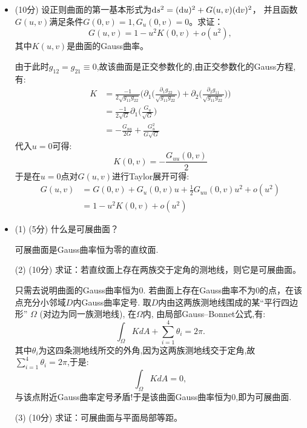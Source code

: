 \begin{itemize}
\begin{proofc}
$$        $$
        可得$\frac{d\gamma}{dt}$为主方向.综上,主方向决定于微分方程(1)(2).
    \end{proofc}
    \item[三] (10分) 设正则曲面的第一基本形式为${\rm d}s^2=({\rm d}u)^2+G(u,v)({\rm d}v)^2$，
    并且函数$G(u,v)$满足条件$G(0,v)=1,G_u(0,v)=0$。求证：
    \[G(u,v)=1-u^2K(0,v)+o(u^2),\]
    其中$K(u,v)$是曲面的Gauss曲率。
    \begin{proofc}
        由于此时$g_{12}=g_{21}\equiv 0$,故该曲面是正交参数化的,由正交参数化的Gauss方程,有:
        \begin{align*}
            K&=\frac{-1}{2\sqrt{g_{11}g_{22}}}\Big(\partial_{1}\Big(\frac{\partial_{1}g_{22}}{\sqrt{g_{11}g_{22}}}\Big)+\partial_{2}\Big(\frac{\partial_{2}g_{11}}{\sqrt{g_{11}g_{22}}}\Big)\Big)\\
            &=\frac{-1}{2\sqrt{G}}\partial_{1}\Big(\frac{G_{u}}{\sqrt{G}}\Big)\\
            &=-\frac{G_{uu}}{2G}+\frac{G_{u}^{2}}{G\sqrt{G}}
        \end{align*}
        代入$u=0$可得:
        $$
            K(0,v)=-\frac{G_{uu}(0,v)}{2}
        $$
        于是在$u=0$点对$G(u,v)$进行Taylor展开可得:
        \begin{align*}
            G(u,v)&=G(0,v)+G_{u}(0,v)u+\frac{1}{2}G_{uu}(0,v)u^{2}+o(u^{2})\\
            &=1-u^{2}K(0,v)+o(u^{2})
        \end{align*}
    \end{proofc}
    \item[四] (1) (5分) 什么是可展曲面？
    \begin{proofc}[解]
        可展曲面是Gauss曲率恒为零的直纹面.
    \end{proofc}
    (2) (10分) 求证：若直纹面上存在两族交于定角的测地线，则它是可展曲面。
    \begin{proofc}
        只需去说明曲面的Gauss曲率恒为$0$. 
        若曲面上存在Gauss曲率不为$0$的点，在该点充分小邻域$D$内Gauss曲率定号. 
        取$D$内由这两族测地线围成的某``平行四边形'' $\Omega$ (对边为同一族测地线), 
        在$\Omega$内, 由局部Gauss--Bonnet公式,有:
        $$
            \int_{\Omega}KdA+\sum_{i=1}^{4}\theta_{i}=2\pi.
        $$
        其中$\theta_{i}$为这四条测地线所交的外角,因为这两族测地线交于定角,故$\sum\limits_{i=1}^{4}\theta_{i}=2\pi$,于是:
        $$
            \int_{\Omega}KdA = 0,
        $$
        与该点附近Gauss曲率定号矛盾!于是该曲面Gauss曲率恒为$0$,即为可展曲面.
    \end{proofc}
    (3) (10分) 求证：可展曲面与平面局部等距。

\end{itemize}
